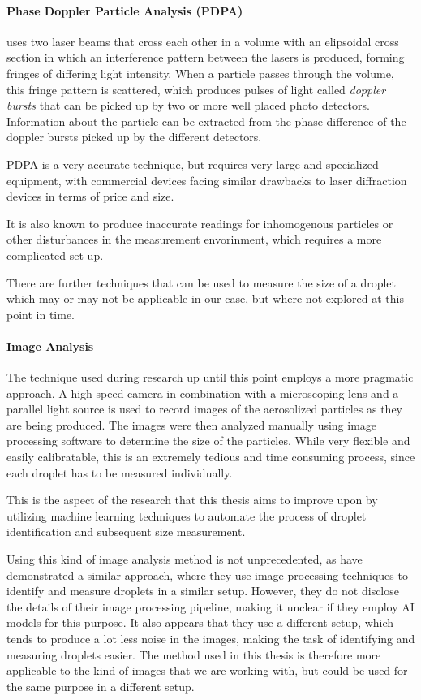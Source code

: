\paragraph{Phase Doppler Particle Analysis (PDPA)} uses two laser beams that cross each other in a volume with an elipsoidal cross section in which an interference pattern between the lasers is produced, forming fringes of differing light intensity. \cite{hollPARTICLEDEPOSITIONVELOCITIES}
When a particle passes through the volume, this fringe pattern is scattered, which produces pulses of light called \emph{doppler bursts} that can be picked up by two or more well placed photo detectors.
Information about the particle can be extracted from the phase difference of the doppler bursts picked up by the different detectors.

PDPA is a very accurate technique, but requires very large and specialized equipment, with commercial devices facing similar drawbacks to laser diffraction devices in terms of price and size.

It is also known to produce inaccurate readings for inhomogenous particles or other disturbances in the measurement envorinment, which requires a more complicated set up.

There are further techniques that can be used to measure the size of a droplet which may or may not be applicable in our case, but where not explored at this point in time. 

\paragraph{Image Analysis} 
The technique used during research up until this point employs a more pragmatic approach. A high speed camera in combination with a microscoping lens and a parallel light source is used to record images of the aerosolized particles as they are being produced. The images were then analyzed manually using image processing software to determine the size of the particles. While very flexible and easily calibratable, this is an extremely tedious and time consuming process, since each droplet has to be measured individually.

This is the aspect of the research that this thesis aims to improve upon by utilizing machine learning techniques to automate the process of droplet identification and subsequent size measurement.

Using this kind of image analysis method is not unprecedented, as \cite{sijsDropSizeMeasurement2021} have demonstrated a similar approach, where they use image processing techniques to identify and measure droplets in a similar setup. 
However, they do not disclose the details of their image processing pipeline, making it unclear if they employ AI models for this purpose. 
It also appears that they use a different setup, which tends to produce a lot less noise in the images, making the task of identifying and measuring droplets easier.
The method used in this thesis is therefore more applicable to the kind of images that we are working with, but could be used for the same purpose in a different setup.

